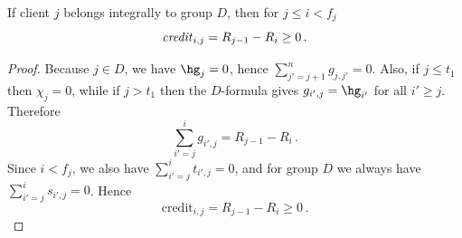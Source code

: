 \begin{lemma}
    \label{lem:credit-D-before}
    If client $j$ belongs integrally to group $D$, then for $j \leq i < f_j$
    \begin{equation*}
        \text{\emph{credit}}_{i,j} = R_{j-1}-R_i \ge 0\,.
    \end{equation*}
\end{lemma}
\begin{proof}
    Because $j \in D$, we have $\hg_j=0$, hence $\sum_{j'=j+1}^n g_{j,j'}=0$.
    Also, if $j \le t_1$ then $\chi_j=0$, while if $j>t_1$ then the $D$-formula gives $g_{i',j}=\hg_{i'}$ for all $i' \ge j$.
    Therefore
    \begin{equation*}
        \sum_{i'=j}^{i} g_{i',j} = R_{j-1}-R_i\,.
    \end{equation*}
    Since $i<f_j$, we also have $\sum_{i'=j}^{i} t_{i',j}=0$, and for group $D$ we always have $\sum_{i'=j}^{i} s_{i',j}=0$.
    Hence
    \begin{equation*}
        \text{credit}_{i,j} = R_{j-1}-R_i \ge 0\,.
    \end{equation*}
\end{proof}

